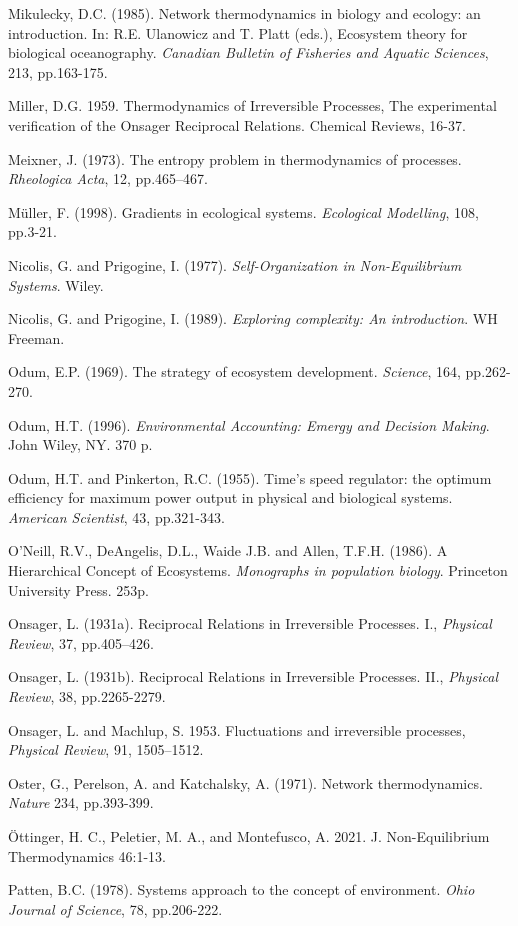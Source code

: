 \documentclass[11pt,letterpaper,]{paper}
\begin{document}
Mikulecky, D.C. (1985). Network thermodynamics in biology and ecology:
an introduction. In: R.E. Ulanowicz and T. Platt (eds.), Ecosystem
theory for biological oceanography. \emph{Canadian Bulletin of Fisheries
and Aquatic Sciences}, 213, pp.163-175.

Miller, D.G. 1959. Thermodynamics of Irreversible Processes, The
experimental verification of the Onsager Reciprocal Relations. Chemical
Reviews, 16-37.

Meixner, J. (1973). The entropy problem in thermodynamics of processes.
\emph{Rheologica Acta}, 12, pp.465--467.

Müller, F. (1998). Gradients in ecological systems. \emph{Ecological
Modelling}, 108, pp.3-21.

Nicolis, G. and Prigogine, I. (1977). \emph{Self-Organization in
Non-Equilibrium Systems}. Wiley.

Nicolis, G. and Prigogine, I. (1989). \emph{Exploring complexity: An
introduction}. WH Freeman.

Odum, E.P. (1969). The strategy of ecosystem development.
\emph{Science}, 164, pp.262-270.

Odum, H.T. (1996). \emph{Environmental Accounting: Emergy and Decision
Making}. John Wiley, NY. 370 p.~

Odum, H.T. and Pinkerton, R.C. (1955). Time's speed regulator: the
optimum efficiency for maximum power output in physical and biological
systems. \emph{American Scientist}, 43, pp.321-343.

O'Neill, R.V., DeAngelis, D.L., Waide J.B. and Allen, T.F.H. (1986). A
Hierarchical Concept of Ecosystems. \emph{Monographs in population
biology}. Princeton University Press. 253p.

Onsager, L. (1931a). Reciprocal Relations in Irreversible Processes. I.,
\emph{Physical Review}, 37, pp.405--426.

Onsager, L. (1931b). Reciprocal Relations in Irreversible Processes.
II., \emph{Physical Review}, 38, pp.2265-2279.

Onsager, L. and Machlup, S. 1953. Fluctuations and irreversible
processes, \emph{Physical Review}, 91, 1505--1512.

Oster, G., Perelson, A. and Katchalsky, A. (1971). Network
thermodynamics. \emph{Nature} 234, pp.393-399.

Öttinger, H. C., Peletier, M. A., and Montefusco, A. 2021. J.
Non-Equilibrium Thermodynamics 46:1-13.

Patten, B.C. (1978). Systems approach to the concept of environment.
\emph{Ohio Journal of Science}, 78, pp.206-222.
\end{document}
